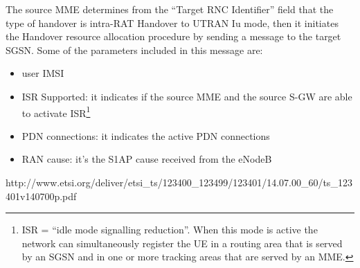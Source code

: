 	\item [3)] The source MME determines from the ``Target RNC Identifier'' field that
	the type of handover is intra-RAT Handover to UTRAN Iu mode, then it
	initiates the Handover resource allocation procedure by sending a  message to the target SGSN. Some of the parameters included
	in this message are:
	\begin{itemize}
		\item user IMSI
		\item ISR Supported: it indicates if the source MME and the source S-GW are
		able to activate ISR\footnote{ISR = ``idle mode signalling reduction''. When
		this mode is active the network can simultaneously register the UE in a
		routing area that is served by an SGSN and in one or more tracking areas
		that are served by an MME.}
		\item PDN connections: it indicates the active PDN connections
		\item RAN cause: it's the S1AP cause received from the eNodeB
	\end{itemize}


http://www.etsi.org/deliver/etsi_ts/123400_123499/123401/14.07.00_60/ts_123401v140700p.pdf
